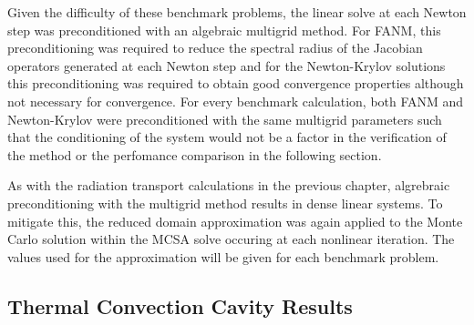 Given the difficulty of these benchmark problems, the linear solve at
each Newton step was preconditioned with an algebraic multigrid
method. For FANM, this preconditioning was required to reduce the
spectral radius of the Jacobian operators generated at each Newton
step and for the Newton-Krylov solutions this preconditioning was
required to obtain good convergence properties although not necessary
for convergence. For every benchmark calculation, both FANM and
Newton-Krylov were preconditioned with the same multigrid parameters
such that the conditioning of the system would not be a factor in the
verification of the method or the perfomance comparison in the
following section. 

As with the radiation transport calculations in the previous chapter,
algrebraic preconditioning with the multigrid method results in dense
linear systems. To mitigate this, the reduced domain approximation was
again applied to the Monte Carlo solution within the MCSA solve
occuring at each nonlinear iteration. The values used for the
approximation will be given for each benchmark problem.

\subsection{Thermal Convection Cavity Results}
\label{subsec:thermal_convection_verification}

